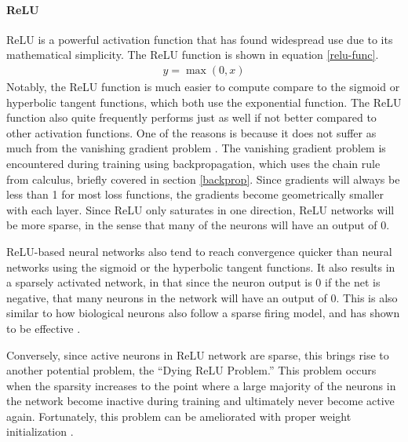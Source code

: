 \paragraph{ReLU}
ReLU is a powerful activation function that has found widespread use due to its mathematical simplicity. The ReLU function is shown in equation \ref{relu-func}.
\begin{align}
y = \max(0, x) \label{relu-func}
\end{align}
Notably, the ReLU function is much easier to compute compare to the sigmoid or hyperbolic tangent functions, which both use the exponential function. The ReLU function also quite frequently performs just as well if not better compared to other activation functions. One of the reasons is because it does not suffer as much from the vanishing gradient problem \cite{pmlr-v15-glorot11a}. The vanishing gradient problem is encountered during training using backpropagation, which uses the chain rule from calculus, briefly covered in section \ref{backprop}. Since gradients will always be less than 1 for most loss functions, the gradients become geometrically smaller with each layer. Since ReLU only saturates in one direction, ReLU networks will be more sparse, in the sense that many of the neurons will have an output of 0. 

ReLU-based neural networks also tend to reach convergence quicker than neural networks using the sigmoid or the hyperbolic tangent functions. It also results in a sparsely activated network, in that since the neuron output is 0 if the net is negative, that many neurons in the network will have an output of 0. This is also similar to how biological neurons also follow a sparse firing model, and has shown to be effective \cite{pmlr-v15-glorot11a}. 

Conversely, since active neurons in ReLU network are sparse, this brings rise to another potential problem, the ``Dying ReLU Problem.'' This problem occurs when the sparsity increases to the point where a large majority of the neurons in the network become inactive during training and ultimately never become active again. Fortunately, this problem can be ameliorated with proper weight initialization \cite{Lu2019DyingRA}.


